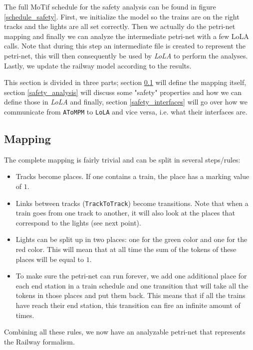 \documentclass{article}
\begin{document}
The full MoTif schedule for the safety analysis can be found in figure \ref{schedule_safety}. First, we initialize the model so the trains are on the right tracks and the lights are all set correctly. Then we actually do the petri-net mapping and finally we can analyze the intermediate petri-net with a few LoLA calls. Note that during this step an intermediate file is created to represent the petri-net, this will then consequently be used by \textit{LoLA} to perform the analyses. Lastly, we update the railway model according to the results.

This section is divided in three parts; section \ref{petri-net_mapping} will define the mapping itself, section \ref{safety_analysis} will discuss some "safety" properties and how we can define those in \textit{LoLA} and finally, section \ref{safety_interfaces} will go over how we communicate from \texttt{AToMPM} to \texttt{LoLA} and vice versa, i.e. what their interfaces are.

\subsection{Mapping}
\label{petri-net_mapping}

The complete mapping is fairly trivial and can be split in several steps/rules:

\begin{itemize}
    \item Tracks become places. If one contains a train, the place has a marking value of $1$.
    \item Links between tracks (\texttt{TrackToTrack}) become transitions. Note that when a train goes from one track to another, it will also look at the places that correspond to the lights (see next point).
    \item Lights can be split up in two places: one for the green color and one for the red color. This will mean that at all time the sum of the tokens of these places will be equal to $1$.
    \item To make sure the petri-net can run forever, we add one additional place for each end station in a train schedule and one transition that will take all the tokens in those places and put them back. This means that if all the trains have reach their end station, this transition can fire an infinite amount of times.
\end{itemize}

Combining all these rules, we now have an analyzable petri-net that represents the Railway formalism.
\end{document}
